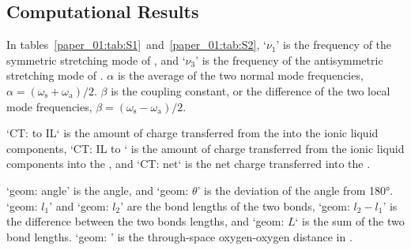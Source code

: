 {\subsection{Computational Results}
\label{anionSI_comp}
In tables~\ref{paper_01:tab:S1}~and~\ref{paper_01:tab:S2}, `\(\nu_1\)' is the frequency of the symmetric stretching mode of , and `\(\nu_3\)' is the frequency of the antisymmetric stretching mode of . \(\alpha\) is the average of the two normal mode frequencies, \(\alpha = (\omega_\mathrm{s} + \omega_\mathrm{a})/2\). \(\beta\) is the coupling constant, or the difference of the two local mode frequencies, \(\beta = (\omega_\mathrm{s} - \omega_\mathrm{a})/2\).

`CT:  to IL` is the amount of charge transferred from the  into the ionic liquid components, `CT: IL to ` is the amount of charge transferred from the ionic liquid components into the , and `CT: net` is the net charge transferred into the .

`geom: angle' is the   angle, and `geom: \(\theta\)' is the deviation of the angle from \ang{180}. `geom: \(l_1\)' and `geom: \(l_2\)' are the bond lengths of the two  bonds, `geom: \(l_2 - l_1\)' is the difference between the two bonds lengths, and `geom: \(L\)` is the sum of the two bond lengths. `geom: ' is the through-space oxygen-oxygen distance in .

}
